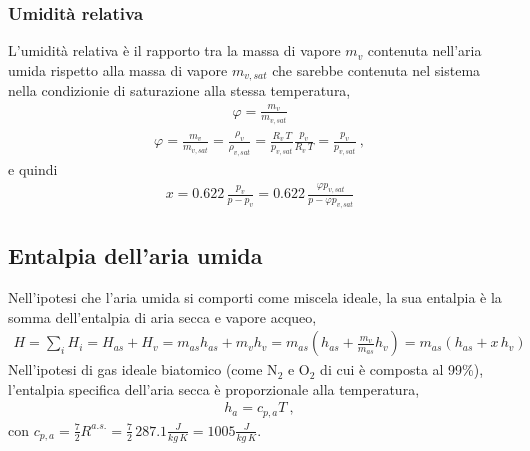 \documentclass[letterpaper,10pt,italian]{jupyterBook}
\begin{document}
\subsubsection{Umidità relativa}
\label{\detokenize{ch/thermodynamics/humid-air:umidita-relativa}}
\sphinxAtStartPar
L’umidità relativa è il rapporto tra la massa di vapore \(m_v\) contenuta nell’aria umida rispetto alla massa di vapore \(m_{v,sat}\) che sarebbe contenuta nel sistema nella condizionie di saturazione alla stessa temperatura,
\begin{equation*}
\begin{split}\varphi = \frac{m_v}{m_{v,sat}}\end{split}
\end{equation*}\begin{equation*}
\begin{split}\varphi = \frac{m_v}{m_{v,sat}} = \frac{\rho_v}{\rho_{v,sat}} = \frac{R_v \, T}{p_{v,sat}} \frac{p_v}{R_v \, T} = \frac{p_v}{p_{v,sat}} \ ,\end{split}
\end{equation*}
\sphinxAtStartPar
e quindi
\begin{equation*}
\begin{split}x = 0.622 \, \frac{p_v}{p - p_v} = 0.622 \, \frac{ \varphi p_{v,sat} }{p - \varphi p_{v,sat}}\end{split}
\end{equation*}

\subsection{Entalpia dell’aria umida}
\label{\detokenize{ch/thermodynamics/humid-air:entalpia-dell-aria-umida}}
\sphinxAtStartPar
Nell’ipotesi che l’aria umida si comporti come miscela ideale, la sua entalpia è la somma dell’entalpia di aria secca e vapore acqueo,
\begin{equation*}
\begin{split}H = \sum_i H_i
  = H_{as} + H_v = m_{as} h_{as} + m_v h_v
  = m_{as} \left( h_{as} + \frac{m_v}{m_{as}} h_v \right)
  = m_{as} \left( h_{as} + x \, h_v \right)
\end{split}
\end{equation*}
\sphinxAtStartPar
Nell’ipotesi di gas ideale biatomico (come N\(_2\) e O\(_2\) di cui è composta al 99\%), l’entalpia specifica dell’aria secca è proporzionale alla temperatura,
\begin{equation*}
\begin{split}h_a = c_{p,a} T \ ,\end{split}
\end{equation*}
\sphinxAtStartPar
con \(c_{p,a} = \frac{7}{2} R^{a.s.} = \frac{7}{2} \, 287.1 \frac{J}{kg \, K} = 1005 \frac{J}{kg \, K}\).
\end{document}
